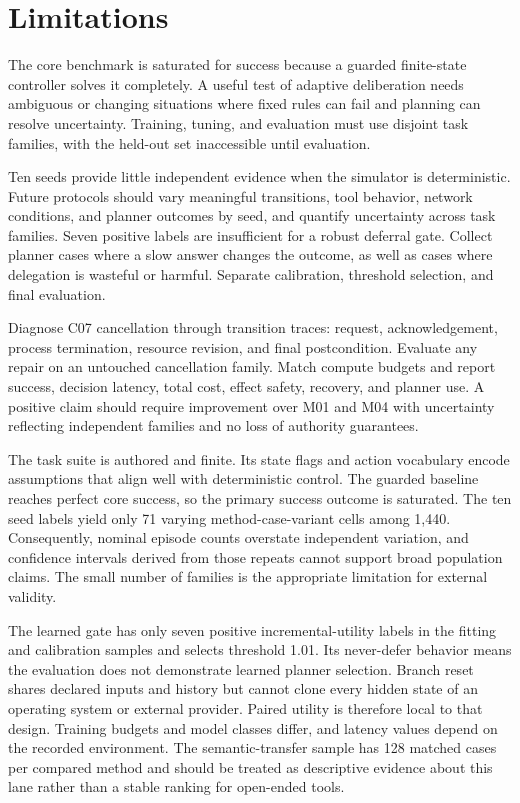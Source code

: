 \documentclass[11pt]{article}
\begin{document}
\section{Limitations}
The core benchmark is saturated for success because a guarded finite-state controller solves it completely. A useful test of adaptive deliberation needs ambiguous or changing situations where fixed rules can fail and planning can resolve uncertainty. Training, tuning, and evaluation must use disjoint task families, with the held-out set inaccessible until evaluation.

Ten seeds provide little independent evidence when the simulator is deterministic. Future protocols should vary meaningful transitions, tool behavior, network conditions, and planner outcomes by seed, and quantify uncertainty across task families. Seven positive labels are insufficient for a robust deferral gate. Collect planner cases where a slow answer changes the outcome, as well as cases where delegation is wasteful or harmful. Separate calibration, threshold selection, and final evaluation.

Diagnose C07 cancellation through transition traces: request, acknowledgement, process termination, resource revision, and final postcondition. Evaluate any repair on an untouched cancellation family. Match compute budgets and report success, decision latency, total cost, effect safety, recovery, and planner use. A positive claim should require improvement over M01 and M04 with uncertainty reflecting independent families and no loss of authority guarantees.


The task suite is authored and finite. Its state flags and action vocabulary encode assumptions that align well with deterministic control. The guarded baseline reaches perfect core success, so the primary success outcome is saturated. The ten seed labels yield only 71 varying method-case-variant cells among 1,440. Consequently, nominal episode counts overstate independent variation, and confidence intervals derived from those repeats cannot support broad population claims. The small number of families is the appropriate limitation for external validity.

The learned gate has only seven positive incremental-utility labels in the fitting and calibration samples and selects threshold 1.01. Its never-defer behavior means the evaluation does not demonstrate learned planner selection. Branch reset shares declared inputs and history but cannot clone every hidden state of an operating system or external provider. Paired utility is therefore local to that design. Training budgets and model classes differ, and latency values depend on the recorded environment. The semantic-transfer sample has 128 matched cases per compared method and should be treated as descriptive evidence about this lane rather than a stable ranking for open-ended tools.
\end{document}

